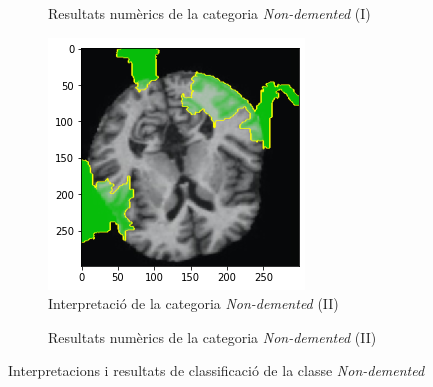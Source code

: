 \documentclass[a4paper,12pt]{report}
\begin{document}
\begin{figure}[h!]
\begin{subfigure}[b]{0.40\linewidth}
        \caption{Resultats numèrics de la categoria \textit{Non-demented} (I)}
        \label{fig:ClassificacioND1}
    \end{subfigure}
    \begin{subfigure}[b]{0.40\linewidth}
        \includegraphics[width=\linewidth]{images/Non 2.png}
        \caption{Interpretació de la categoria \textit{Non-demented} (II)}
        \label{fig:ND2}
    \end{subfigure}
    \begin{subfigure}[b]{0.40\linewidth}
        \caption{Resultats numèrics de la categoria \textit{Non-demented} (II)}
        \label{fig:ClassificacioND1}
    \end{subfigure}
    \caption{Interpretacions i resultats de classificació de la classe \textit{Non-demented}}
    \label{fig:NDInterpretacions}
\end{figure}
\end{document}
